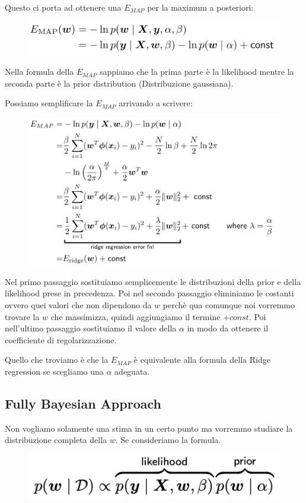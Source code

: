 \documentclass[14pt]{extreport}
\begin{document}
Questo ci porta ad ottenere una $E_{MAP}$ per la maximum a posteriori:

\begin{figure}[H]
	\centering
	\includegraphics[width=0.7\linewidth]{121.jpeg}
\end{figure}

Nella formula della $E_{MAP}$ sappiamo che la prima parte è la likelihood mentre la seconda parte è la prior distribution (Distribuzione gaussiana).

Possiamo semplificare la $E_{MAP}$ arrivando a scrivere:

\begin{figure}[H]
	\centering
	\includegraphics[width=0.7\linewidth]{122.jpeg}
\end{figure}

Nel primo passaggio sostituiamo semplicemente le distribuzioni della prior e della likelihood prese in precedenza. Poi nel secondo passaggio
eliminiamo le costanti ovvero quei valori che non dipendono da $w$ perchè qua comunque noi vorremmo trovare la $w$ che massimizza, quindi aggiungiamo
il termine $+ const$. Poi nell'ultimo passaggio sostituiamo il valore della $\alpha$ in modo da ottenere il coefficiente di regolarizzazione.

Quello che troviamo è che la $E_{MAP}$ è equivalente alla formula della Ridge regression se scegliamo una $\alpha$ adeguata.

\subsection{Fully Bayesian Approach}

Non vogliamo solamente una stima in un certo punto ma vorremmo studiare la distribuzione completa della $w$. Se consideriamo la
formula.\begin{figure}[H]
	\centering
	\includegraphics[width=0.5\linewidth]{123.jpeg}
\end{figure}
\end{document}
